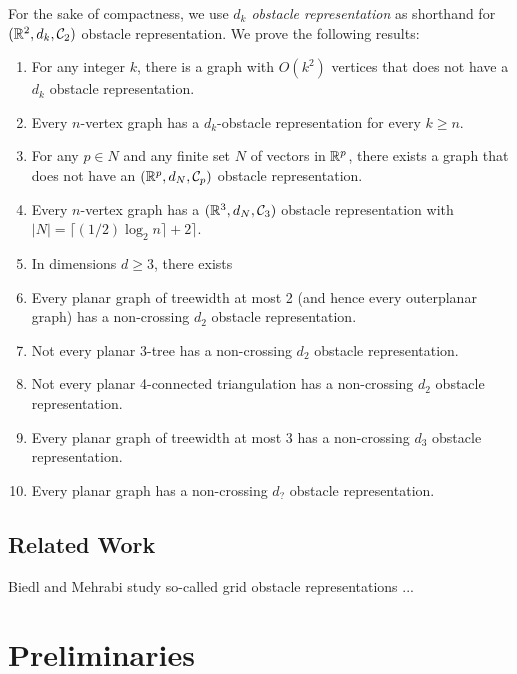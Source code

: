 \documentclass{patmorin}
\begin{document}
For the sake of compactness, we use \emph{$d_k$ obstacle representation}
as shorthand for $(\mathbb{R}^2,d_k,\mathcal{C}_2)$ obstacle representation.
We prove the following results:
\begin{enumerate}
   \item For any integer $k$, there is a graph with $O(k^2)$ vertices
     that does not have a $d_k$ obstacle representation. 

   \item Every $n$-vertex graph has a $d_k$-obstacle representation for 
     every $k\ge n$.

   \item For any $p\in N$ and any finite set $N$ of vectors in $\mathbb{R}^p$,
    there exists a graph that does not have an $(\mathbb{R}^p,d_N,\mathcal{C}_p)$
    obstacle representation.

   \item Every $n$-vertex graph has a $(\mathbb{R}^3,d_N,\mathcal{C}_3)$ obstacle
    representation with $|N|=\lceil(1/2)\log_2 n\rceil +2\rceil$.


   \item In dimensions $d\ge 3$, there exists

   \item Every planar graph of treewidth at most 2 (and hence every
     outerplanar graph) has a non-crossing $d_2$ obstacle
     representation.
   \item Not every planar 3-tree has a non-crossing $d_2$
     obstacle representation.
   \item Not every planar 4-connected triangulation has a 
     non-crossing $d_2$ obstacle representation.
   \item Every planar graph of treewidth at most 3 has a 
     non-crossing $d_3$ obstacle representation.
   \item Every planar graph has a non-crossing $d_?$
     obstacle representation.
\end{enumerate}

\subsection{Related Work}

Biedl and Mehrabi study so-called grid obstacle representations \cite{X}...


\section{Preliminaries}
\end{document}
